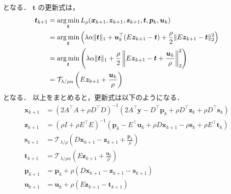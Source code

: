 となる．
$\bm{t}$ の更新式は，
\begin{align}
    \bm{t}_{k+1}
     & = \operatorname*{arg \thinspace min}_{\bm{t}}
    L_{\rho}(\bm{x}_{k+1}, \bm{z}_{k+1}, \bm{s}_{k+1}, \bm{t}, \bm{p}_k, \bm{u}_k)
    \notag                                                                                       \\
     & = \operatorname*{arg \thinspace min}_{\bm{t}} \left(
    \lambda \alpha \|\bm{t}\|_1
    + \bm{u}_k^\top (E \bm{z}_{k+1} - \bm{t})
    + \frac{\rho}{2} \|E \bm{z}_{k+1} - \bm{t}\|_2^2
    \right)
    \notag                                                                                       \\
     & = \operatorname*{arg \thinspace min}_{\bm{t}} \left(
    \lambda \alpha \|\bm{t}\|_1
    + \frac{\rho}{2} \left\|E \bm{z}_{k+1} - \bm{t} + \frac{\bm{u}_k}{\rho} \right\|_2^2
    \right)
    \notag                                                                                       \\
     & = \mathcal{T}_{\lambda/\rho \alpha} \left( E \bm{z}_{k+1} + \frac{\bm{u}_k}{\rho} \right)
\end{align}
となる．
以上をまとめると，更新式は以下のようになる．
\begin{align}
    \bm{x}_{k+1}
     & = (2 A^\top A + \rho D^\top D)^{-1} \left(
    2 A^\top \bm{y} - D^\top \bm{p}_k + \rho D^\top \bm{z}_k + \rho D^\top \bm{s}_k
    \right)
    \\
    \bm{z}_{k+1}
     & = (\rho I + \rho E^\top E)^{-1} \left(
    \bm{p}_k - E^\top \bm{u}_k + \rho D \bm{x}_{k+1} - \rho \bm{s}_k + \rho E^\top \bm{t}_k
    \right)
    \\
    \bm{s}_{k+1}
     & = \mathcal{T}_{\lambda/\rho} \left( D \bm{x}_{k+1} - \bm{z}_{k+1} + \frac{\bm{p}_k}{\rho} \right)
    \\
    \bm{t}_{k+1}
     & = \mathcal{T}_{\lambda/\rho \alpha} \left( E \bm{z}_{k+1} + \frac{\bm{u}_k}{\rho} \right)
    \\
    \bm{p}_{k+1}
     & = \bm{p}_k + \rho (D \bm{x}_{k+1} - \bm{z}_{k+1} - \bm{s}_{k+1})
    \\
    \bm{u}_{k+1}
     & = \bm{u}_k + \rho (E \bm{z}_{k+1} - \bm{t}_{k+1})
\end{align}
